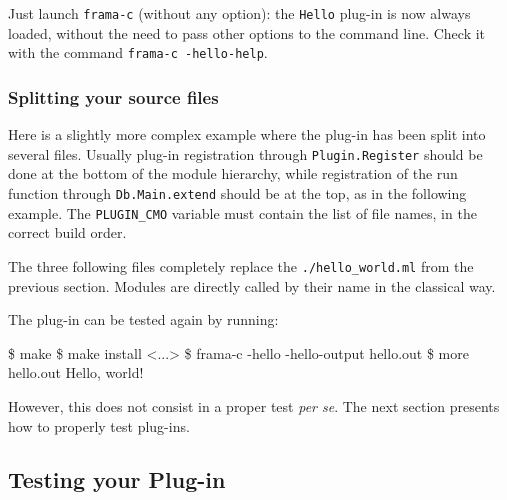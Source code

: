 Just launch \texttt{frama-c} (without any option): the \texttt{Hello}
plug-in is now always loaded, without the need to pass other options to
the command line. Check it with the command \texttt{frama-c -hello-help}.

\subsubsection*{Splitting your source files}

Here is a slightly more complex example where the plug-in has been split into
several files. Usually plug-in registration through \texttt{Plugin.Register}
should be done at the bottom of the module hierarchy, while registration of the
run function through \texttt{Db.Main.extend} should be at the top, as in the
following example. The \texttt{PLUGIN\_CMO} variable must contain the list of
file names, in the correct \ocaml build order.


The three following files completely replace the \texttt{./hello\_world.ml}
from the previous section. Modules are directly called by their name in the
classical \ocaml way.




The plug-in can be tested again by running:

\begin{shell}
\$ make
\$ make install
<...>
\$ frama-c -hello -hello-output hello.out
\$ more hello.out
Hello, world!
\end{shell}

However, this does not consist in a proper test \emph{per se}. The next section
presents how to properly test plug-ins.

\subsection{Testing your Plug-in}\label{tut2:testing}

